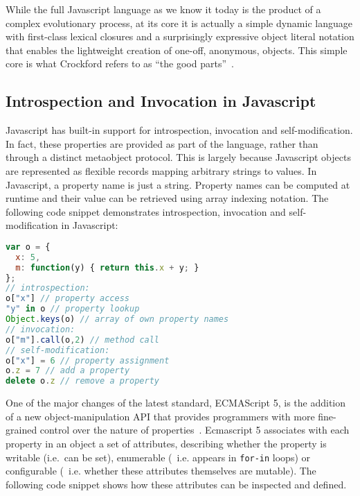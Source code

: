 \documentclass{acm_proc_article-sp}
\begin{document}

While the full Javascript language as we know it today is the product of a complex evolutionary process, at its core it is actually a simple dynamic language with first-class lexical closures and a surprisingly expressive object literal notation that enables the lightweight creation of one-off, anonymous, objects. This simple core is what Crockford refers to as ``the good parts''~\cite{crockford_goodparts}.

\subsection{Introspection and Invocation in Javascript}
\label{sub:introspection_in_js}

Javascript has built-in support for introspection, invocation and self-modification. In fact, these properties are provided as part of the language, rather than through a distinct metaobject protocol. This is largely because Javascript objects are represented as flexible records mapping arbitrary strings to values. In Javascript, a property name is just a string. Property names can be computed at runtime and their value can be retrieved using array indexing notation. The following code snippet demonstrates introspection, invocation and self-modification in Javascript:

\begin{lstlisting}[language=javascript]
var o = {
  x: 5,
  m: function(y) { return this.x + y; }
};
// introspection:
o["x"] // property access
"y" in o // property lookup
Object.keys(o) // array of own property names
// invocation:
o["m"].call(o,2) // method call
// self-modification:
o["x"] = 6 // property assignment
o.z = 7 // add a property
delete o.z // remove a property
\end{lstlisting}

One of the major changes of the latest standard, ECMAScript 5, is the addition of a new object-manipulation API that provides programmers with more fine-grained control over the nature of properties~\cite{ecma262}. Ecmascript 5 associates with each property in an object a set of attributes, describing whether the property is writable (i.e.~can be set), enumerable (~i.e. appears in \texttt{for-in} loops) or configurable (~i.e. whether these attributes themselves are mutable). The following code snippet shows how these attributes can be inspected and defined.
\end{document}
